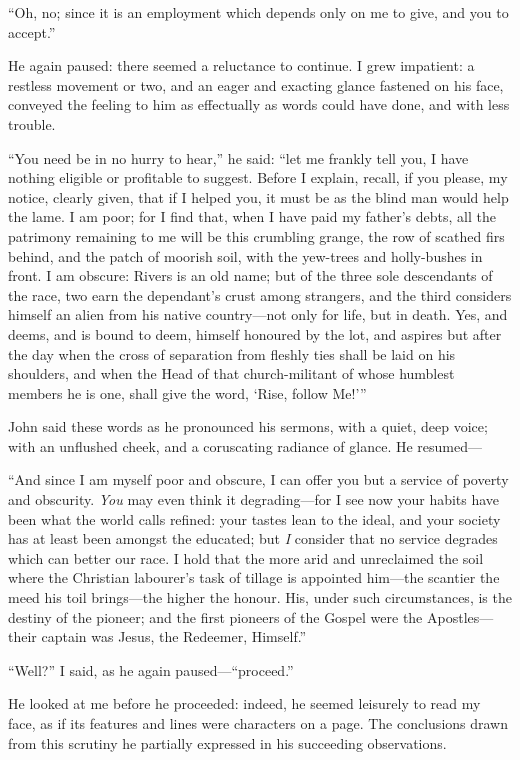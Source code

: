 \enquote{Oh, no; since it is an employment which depends only on me to
give, and you to accept.}

He again paused: there seemed a reluctance to continue. I grew
impatient: a restless movement or two, and an eager and exacting glance
fastened on his face, conveyed the feeling to him as effectually as
words could have done, and with less trouble.

\enquote{You need be in no hurry to hear,} he said: \enquote{let me
frankly tell you, I have nothing eligible or profitable to suggest. 
Before I explain, recall, if you please, my notice, clearly given, that
if I helped you, it must be as the blind man would help the lame. I am
poor; for I find that, when I have paid my father's debts, all the
patrimony remaining to me will be this crumbling grange, the row of
scathed firs behind, and the patch of moorish soil, with the yew-trees
and holly-bushes in front. I am obscure: Rivers is an old name; but of
the three sole descendants of the race, two earn the dependant's crust
among strangers, and the third considers himself an alien from his
native country---not only for life, but in death. Yes, and deems, and
is bound to deem, himself honoured by the lot, and aspires but after the
day when the cross of separation from fleshly ties shall be laid on his
shoulders, and when the Head of that church-militant of whose humblest
members he is one, shall give the word, \enquote{Rise, follow Me!}}

\St{} John said these words as he pronounced his sermons, with a quiet,
deep voice; with an unflushed cheek, and a coruscating radiance of
glance. He resumed---

\enquote{And since I am myself poor and obscure, I can offer you but a service
of poverty and obscurity. \emph{You} may even think it degrading---for
I see now your habits have been what the world calls refined: your
tastes lean to the ideal, and your society has at least been amongst the
educated; but \emph{I} consider that no service degrades which can
better our race. I hold that the more arid and unreclaimed the soil
where the Christian labourer's task of tillage is appointed him---the
scantier the meed his toil brings---the higher the honour. His, under
such circumstances, is the destiny of the pioneer; and the first
pioneers of the Gospel were the Apostles---their captain was Jesus, the
Redeemer, Himself.}

\enquote{Well?} I said, as he again paused---\enquote{proceed.}

He looked at me before he proceeded: indeed, he seemed leisurely to read
my face, as if its features and lines were characters on a page. The
conclusions drawn from this scrutiny he partially expressed in his
succeeding observations.

